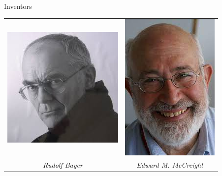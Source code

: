 \documentclass{beamer}
\begin{document}
\begin{frame}{Inventors}
\begin{table}[]
    \centering
    \begin{tabular}{c c}
        \includegraphics[scale = 0.5]{Images/Bayer.jpg} & \includegraphics[scale = 0.5]{Images/Edward.jpg} \\
       \textit{Rudolf Bayer} & \textit{Edward M. McCreight} \\
    \end{tabular}
\end{table}    
\end{frame}
\end{document}
